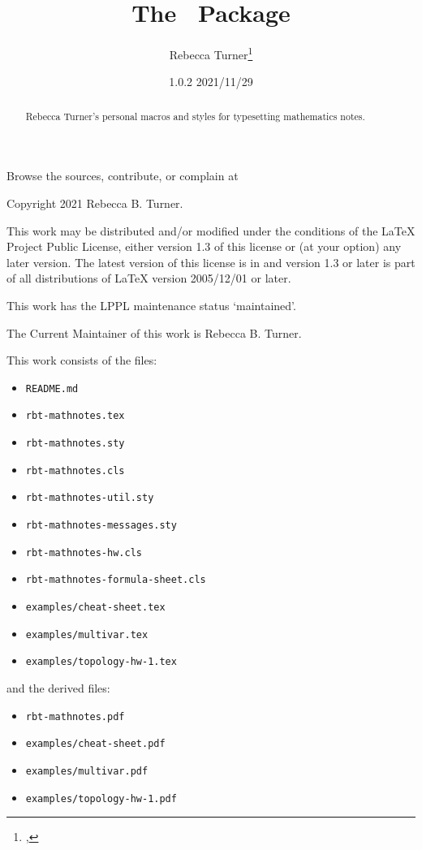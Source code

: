 \documentclass{ltxguidex}
\author{Rebecca Turner\thanks{\email{rbt@sent.as}, \https{becca.ooo}}}
\title{The \mn\ Package}
\date{1.0.2 2021/11/29}
\begin{document}
\maketitle

\begin{abstract}
  Rebecca Turner's personal macros and styles for typesetting mathematics
  notes.
\end{abstract}

\begin{note}
  Browse the sources, contribute, or complain at \\
\end{note}

\tableofcontents
\vfill
\pagebreak

\begin{note}
  Copyright 2021 Rebecca B. Turner.

  This work may be distributed and/or modified under the
  conditions of the LaTeX Project Public License, either version 1.3
  of this license or (at your option) any later version.
  The latest version of this license is in
  and version 1.3 or later is part of all distributions of LaTeX
  version 2005/12/01 or later.

  This work has the LPPL maintenance status `maintained'.

  The Current Maintainer of this work is Rebecca B. Turner.

  This work consists of the files:
    \begin{itemize}
      \item \texttt{README.md}
      \item \texttt{rbt-mathnotes.tex}
      \item \texttt{rbt-mathnotes.sty}
      \item \texttt{rbt-mathnotes.cls}
      \item \texttt{rbt-mathnotes-util.sty}
      \item \texttt{rbt-mathnotes-messages.sty}
      \item \texttt{rbt-mathnotes-hw.cls}
      \item \texttt{rbt-mathnotes-formula-sheet.cls}
      \item \texttt{examples/cheat-sheet.tex}
      \item \texttt{examples/multivar.tex}
      \item \texttt{examples/topology-hw-1.tex}
    \end{itemize}
  and the derived files:
    \begin{itemize}
      \item \texttt{rbt-mathnotes.pdf}
      \item \texttt{examples/cheat-sheet.pdf}
      \item \texttt{examples/multivar.pdf}
      \item \texttt{examples/topology-hw-1.pdf}
    \end{itemize}
\end{note}
\end{document}
